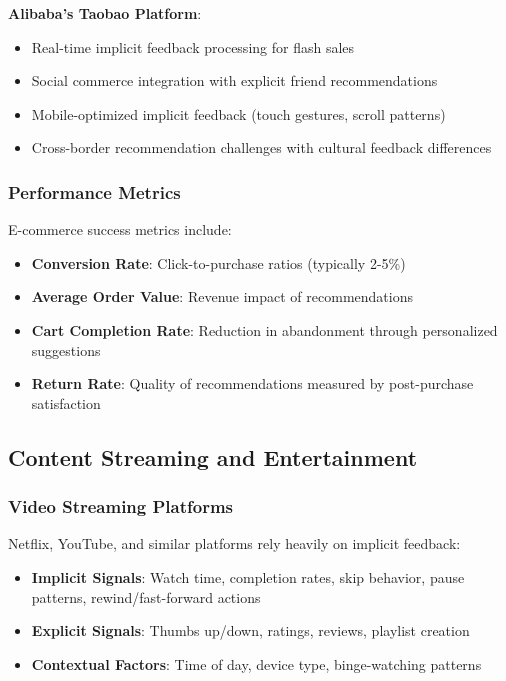 \documentclass[acmsmall,review,anonymous]{acmart}
\begin{document}
\textbf{Alibaba's Taobao Platform}:
\begin{itemize}
    \item Real-time implicit feedback processing for flash sales
    \item Social commerce integration with explicit friend recommendations
    \item Mobile-optimized implicit feedback (touch gestures, scroll patterns)
    \item Cross-border recommendation challenges with cultural feedback differences
\end{itemize}

\subsubsection{Performance Metrics}

E-commerce success metrics include:
\begin{itemize}
    \item \textbf{Conversion Rate}: Click-to-purchase ratios (typically 2-5\%)
    \item \textbf{Average Order Value}: Revenue impact of recommendations
    \item \textbf{Cart Completion Rate}: Reduction in abandonment through personalized suggestions
    \item \textbf{Return Rate}: Quality of recommendations measured by post-purchase satisfaction
\end{itemize}

\subsection{Content Streaming and Entertainment}

\subsubsection{Video Streaming Platforms}

Netflix, YouTube, and similar platforms rely heavily on implicit feedback:

\begin{itemize}
    \item \textbf{Implicit Signals}: Watch time, completion rates, skip behavior, pause patterns, rewind/fast-forward actions
    \item \textbf{Explicit Signals}: Thumbs up/down, ratings, reviews, playlist creation
    \item \textbf{Contextual Factors}: Time of day, device type, binge-watching patterns
\end{itemize}
\end{document}
